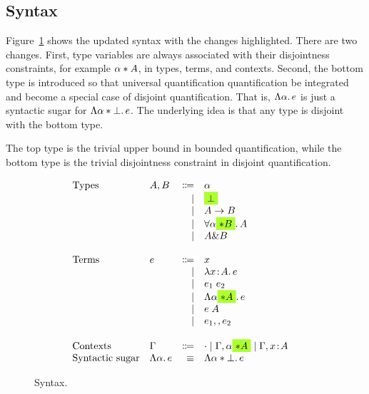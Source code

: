 \subsection{Syntax}

Figure~\ref{fig:fi-syntax} shows the updated syntax with the changes
highlighted. There are two changes. First, type variables are always associated
with their disjointness constraints, for example $\alpha * A$, in types,
terms, and contexts. Second, the bottom type is introduced so that universal
quantification quantification be integrated and become a special case of
disjoint quantification. That is, $\Lambda \alpha.\, e$ is just a syntactic sugar
for $\Lambda \alpha * \bot.\, e$. The underlying idea is that any type is
disjoint with the bottom type.

The top type is the trivial upper bound in bounded quantification, while the
bottom type is the trivial disjointness constraint in disjoint quantification.

\begin{figure}
  \[
    \begin{array}{l}
      \begin{array}{llrll}
        \text{Types}
        & A, B & \Coloneqq & \alpha                  & \\
        &      & \mid & \highlight {$\bot$}          & \\
        &      & \mid & A \to B                      & \\
        &      & \mid & \for {\alpha \highlight {$\disjoint B$}} A  & \\
        &      & \mid & A \inter B                   & \\

        \\
        \text{Terms}
        & e & \Coloneqq & x                        & \\
        &   & \mid & \lam x A e                    & \\
        &   & \mid & \app {e_1} {e_2}              & \\
        &   & \mid & \blam {\alpha \highlight {$\disjoint A$}} e  & \\
        &   & \mid & \tapp e A                     & \\
        &   & \mid & e_1 \mergeop e_2              & \\

        \\
        \text{Contexts}
        & \Gamma & \Coloneqq & \cdot
                   \mid \Gamma, \alpha \highlight {$\disjoint A$}
                   \mid \Gamma, x \hast A  & \\

        \text{Syntactic sugar} & \blam {\alpha} e & \equiv & \blam {\alpha \disjoint \bot} e & \\
      \end{array}
    \end{array}
  \]

  \label{fig:fi-syntax}
  \caption{Syntax.}
\end{figure}

